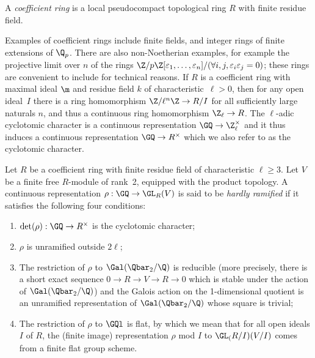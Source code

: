 \begin{definition}
  \label{coefficient-ring}
  A \emph{coefficient ring} is a local pseudocompact topological ring $R$ with
  finite residue field.
\end{definition}

Examples of coefficient rings include finite fields, and integer rings of finite extensions
of $\Q_p$. There are also non-Noetherian examples, for example the projective limit over $n$ of
the rings $\Z/p\Z[\varepsilon_1,\ldots,\varepsilon_n]/(\forall i,j,\varepsilon_i\varepsilon_j=0)$;
these rings are convenient to include
for technical reasons. If $R$ is a coefficient ring with maximal ideal $\m$
and residue field $k$ of characteristic~$\ell>0$, then for any open ideal~$I$ there is
a ring homomorphism $\Z/\ell^n\Z\to R/I$ for all sufficiently large naturals $n$,
and thus a continuous ring homomorphism $\Z_{\ell}\to R$. The $\ell$-adic cyclotomic character
is a continuous
representation $\GQ\to\Z_{\ell}^\times$ and it thus induces a continuous
representation $\GQ\to R^\times$ which we also refer to as the cyclotomic character.

\begin{definition}
  \label{hardly_ramified}
  Let $R$ be a coefficient ring with finite residue field of characteristic $\ell\geq3$.
  Let $V$ be a finite free $R$-module of rank~2, equipped with the product topology. A
  continuous representation $\rho: \GQ\to \GL_R(V)$ is said to be \emph{hardly ramified} if it
  satisfies the following four conditions:
  \begin{enumerate}
  \item $\det(\rho):\GQ\to R^\times$ is the cyclotomic character;
  \item $\rho$ is unramified outside $2\ell$;
  \item The restriction of $\rho$ to $\Gal(\Qbar_2/\Q)$ is reducible (more precisely,
  there is a short exact sequence $0\to R\to V\to R\to 0$ which is stable
  under the action of $\Gal(\Qbar_2/\Q)$) and the Galois action on the 1-dimensional
  quotient is an unramified representation of $\Gal(\Qbar_2/\Q)$ whose square is trivial;
  \item The restriction of $\rho$ to $\GQl$ is flat, by which we mean that for all open
  ideals $I$ of $R$, the (finite image) representation $\rho$ mod $I$ to $\GL_(R/I)(V/I)$
  comes from a finite flat group scheme.
  \end{enumerate}
\end{definition}

